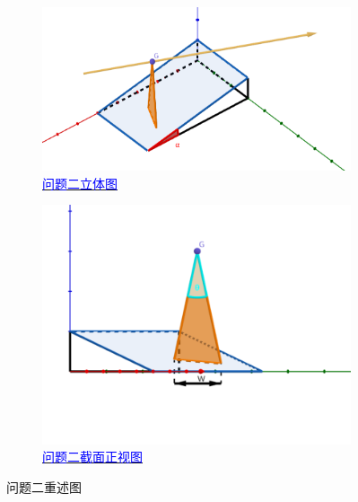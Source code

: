

\begin{figure}[htbp]
    \centering
    \begin{subfigure}[b]{0.45\textwidth}
      \centering
      \includegraphics[scale=0.18]{res/img/问题二重述图.png}
      \caption{\href{https://www.geogebra.org/m/pwzyn5ba}{\textcolor{blue}{问题二立体图}}}
      \label{fig:问题二立体图}
    \end{subfigure}
    \hfill
    \begin{subfigure}[b]{0.45\textwidth}
      \centering
      \includegraphics[scale=0.18]{res/img/问题二重述图_截面图.png}
      \caption{\href{https://www.geogebra.org/m/g2rwmqvx}{\textcolor{blue}{问题二截面正视图}}}
      \label{fig:问题二截面正视图}
    \end{subfigure}
    \caption{问题二重述图}
    \label{fig:问题二重述图}
\end{figure}

